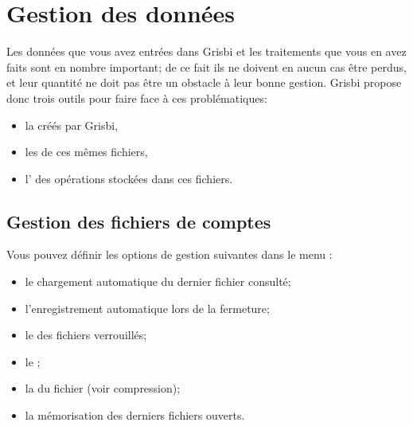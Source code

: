 
\chapter{Gestion des données\label{datamanagement}}


Les données que vous avez entrées dans Grisbi et les traitements que vous en avez faits sont en nombre important; de ce fait ils ne doivent en aucun cas être perdus, et leur quantité ne doit pas être un obstacle à leur bonne gestion. Grisbi propose donc trois outils pour faire face à ces problématiques:
	\begin{itemize}
		\item la  créés par Grisbi,
		\item les  de ces mêmes fichiers,
		\item l' des opérations stockées dans ces fichiers.
	\end{itemize}
	
\section{Gestion des fichiers de comptes\label{datamanagement-files}}

Vous pouvez définir les options de gestion suivantes dans le menu :

\begin{itemize}
	\item le chargement automatique du dernier fichier consulté;
	\item l'enregistrement automatique lors de la fermeture;
	\item le  des fichiers verrouillés;
	\item le ;
	\item la  du fichier (voir \gls{compression});
	\item la mémorisation des derniers fichiers ouverts.
\end{itemize}

